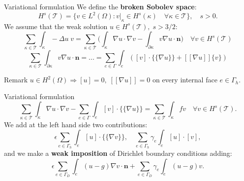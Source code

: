 \documentclass{beamer}
\begin{document}
\begin{frame}{Variational formulation}
	We define the \textbf{broken Sobolev space}:
	\begin{equation*}
		H^s(\mathcal{T}) = \{ v \in L^2(\Omega) : v|_\kappa \in H^s(\kappa)
		\quad \forall \kappa \in \mathcal{T} \}, \quad s>0.
	\end{equation*}
	We assume that the weak solution $u \in H^s(\mathcal{T}), \; s>3/2$:
	\begin{equation*}
		\sum_{\kappa \in \mathcal{T}} \int_\kappa -\Delta u \; v
		= \sum_{\kappa \in \mathcal{T}} \bigg( \int_\kappa \nabla u \cdot
		\nabla v
		- \int_{\partial \kappa} v \nabla u \cdot \mathbf{n} \bigg) \quad
		\forall v
		\in H^s(\mathcal{T})
	\end{equation*}
	\begin{equation*}
			\sum_{\kappa \in \mathcal{T}} \int_{\partial \kappa} v \nabla u
			\cdot \mathbf{n} = ... = \sum_{e \in \Gamma} \int_e ([v]
			\cdot
			\{\!\!\{
			\nabla u \}\!\!\}
			+ [\![
			\nabla u ]\!] \{v\} )
	\end{equation*}
	\begin{block}{Remark}
		$u \in H^2(\Omega) \Rightarrow [u] = 0, \; [\![\nabla u]\!] = 0 $ 
		on every internal face $e \in \Gamma_h$.
	\end{block}
\end{frame}
\begin{frame}{Variational formulation}
	\begin{equation*}
	\sum_{\kappa \in \mathcal{T}} \int_\kappa \nabla u \cdot \nabla v -
	\sum_{e \in \Gamma} \int_e [v] \cdot \{\!\!\{ \nabla u \}\!\!\} =
	\sum_{\kappa \in \mathcal{T}} \int_\kappa fv \quad \forall v \in 
	H^s(\mathcal{T}).
	\end{equation*}
	We add at the left hand side two contributions:
	\begin{equation*}
		\epsilon \sum_{e \in \Gamma_h} \int_e [u] \cdot \{\!\!\{ \nabla v
		\}\!\!\}, \quad \sum_{e \in \Gamma_h} \gamma_e \int_e [u] \cdot [v],
	\end{equation*}
	and we make a \textbf{weak imposition} of Dirichlet boundary conditions 
	adding:
	\begin{equation*}
	\epsilon \sum_{e \in \Gamma_D} \int_e (u-g) \nabla v \cdot \mathbf{n}
	+ \sum_{e \in \Gamma_D} \gamma_e \int_e (u-g)v.
	\end{equation*}
\end{frame}
\end{document}
